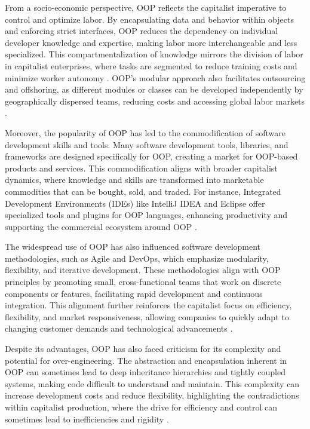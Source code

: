\begin{refsection}
From a socio-economic perspective, OOP reflects the capitalist imperative to control and optimize labor. By encapsulating data and behavior within objects and enforcing strict interfaces, OOP reduces the dependency on individual developer knowledge and expertise, making labor more interchangeable and less specialized. This compartmentalization of knowledge mirrors the division of labor in capitalist enterprises, where tasks are segmented to reduce training costs and minimize worker autonomy \cite[pp.~112-115]{Fowler2015}. OOP's modular approach also facilitates outsourcing and offshoring, as different modules or classes can be developed independently by geographically dispersed teams, reducing costs and accessing global labor markets \cite[pp.~150-153]{Bass2021}.

Moreover, the popularity of OOP has led to the commodification of software development skills and tools. Many software development tools, libraries, and frameworks are designed specifically for OOP, creating a market for OOP-based products and services. This commodification aligns with broader capitalist dynamics, where knowledge and skills are transformed into marketable commodities that can be bought, sold, and traded. For instance, Integrated Development Environments (IDEs) like IntelliJ IDEA and Eclipse offer specialized tools and plugins for OOP languages, enhancing productivity and supporting the commercial ecosystem around OOP \cite[pp.~95-97]{Gamma2015}.

The widespread use of OOP has also influenced software development methodologies, such as Agile and DevOps, which emphasize modularity, flexibility, and iterative development. These methodologies align with OOP principles by promoting small, cross-functional teams that work on discrete components or features, facilitating rapid development and continuous integration. This alignment further reinforces the capitalist focus on efficiency, flexibility, and market responsiveness, allowing companies to quickly adapt to changing customer demands and technological advancements \cite[pp.~78-81]{Pressman2019}.

Despite its advantages, OOP has also faced criticism for its complexity and potential for over-engineering. The abstraction and encapsulation inherent in OOP can sometimes lead to deep inheritance hierarchies and tightly coupled systems, making code difficult to understand and maintain. This complexity can increase development costs and reduce flexibility, highlighting the contradictions within capitalist production, where the drive for efficiency and control can sometimes lead to inefficiencies and rigidity \cite[pp.~102-105]{Abelson2022}.


\end{refsection}
